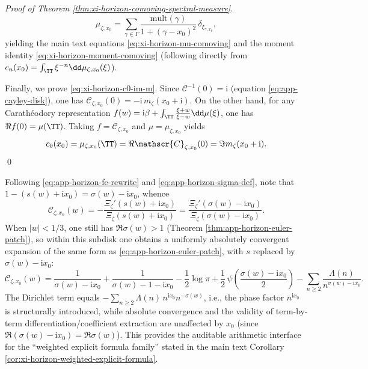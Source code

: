\begin{proof}[Proof of Theorem \ref{thm:xi-horizon-comoving-spectral-measure}]
\[
\mu_{\zeta,x_0}
=
\sum_{\gamma\in\Gamma}\frac{\mathrm{mult}(\gamma)}{1+(\gamma-x_0)^2}\,\delta_{\xi_{\gamma,x_0}},
\]
yielding the main text equations \eqref{eq:xi-horizon-mu-comoving} and the moment identity \eqref{eq:xi-horizon-moment-comoving} (following directly from \(c_n(x_0)=\int_{\TT}\xi^{-n}\dd\mu_{\zeta,x_0}(\xi)\)).
\par
Finally, we prove \eqref{eq:xi-horizon-c0-im-m}.
Since \(\mathcal{C}^{-1}(0)=\mathrm{i}\) (equation \eqref{eq:app-cayley-disk}), one has
\(
\mathscr{C}_{\zeta,x_0}(0)=-\mathrm{i}\,m_{\zeta}(x_0+\mathrm{i})
\).
On the other hand, for any Carath\'eodory representation \(f(w)=\mathrm{i}\beta+\int_{\TT}\frac{\xi+w}{\xi-w}\dd\mu(\xi)\), one has
\(
\Re f(0)=\mu(\TT)
\).
Taking \(f=\mathscr{C}_{\zeta,x_0}\) and \(\mu=\mu_{\zeta,x_0}\) yields
\[
c_0(x_0)=\mu_{\zeta,x_0}(\TT)=\Re \mathscr{C}_{\zeta,x_0}(0)=\Im m_{\zeta}(x_0+\mathrm{i}).
\]
\qed
\end{proof}

\begin{remark}\label{rem:app-horizon-euler-patch-comoving}
Following \eqref{eq:app-horizon-fe-rewrite} and \eqref{eq:app-horizon-sigma-def}, note that
\(
1-(s(w)+\mathrm{i}x_0)=\sigma(w)-\mathrm{i}x_0
\),
whence
\[
\mathscr{C}_{\zeta,x_0}(w)
=-\frac{\Xi_{\zeta}'(s(w)+\mathrm{i}x_0)}{\Xi_{\zeta}(s(w)+\mathrm{i}x_0)}
=\frac{\Xi_{\zeta}'(\sigma(w)-\mathrm{i}x_0)}{\Xi_{\zeta}(\sigma(w)-\mathrm{i}x_0)}.
\]
When \(|w|<1/3\), one still has \(\Re\sigma(w)>1\) (Theorem \ref{thm:app-horizon-euler-patch}), so within this subdisk one obtains a uniformly absolutely convergent expansion of the same form as \eqref{eq:app-horizon-euler-patch}, with \(s\) replaced by \(\sigma(w)-\mathrm{i}x_0\):
\[
\mathscr{C}_{\zeta,x_0}(w)
=\frac{1}{\sigma(w)-\mathrm{i}x_0}+\frac{1}{\sigma(w)-1-\mathrm{i}x_0}
-\frac12\log\pi+\frac12\,\psi\!\left(\frac{\sigma(w)-\mathrm{i}x_0}{2}\right)
-\sum_{n\ge2}\frac{\Lambda(n)}{n^{\sigma(w)-\mathrm{i}x_0}}.
\]
The Dirichlet term equals \(-\sum_{n\ge2}\Lambda(n)\,n^{\mathrm{i}x_0}n^{-\sigma(w)}\), i.e., the phase factor \(n^{\mathrm{i}x_0}\) is structurally introduced, while absolute convergence and the validity of term-by-term differentiation/coefficient extraction are unaffected by \(x_0\) (since \(\Re(\sigma(w)-\mathrm{i}x_0)=\Re\sigma(w)\)).
This provides the auditable arithmetic interface for the ``weighted explicit formula family'' stated in the main text Corollary \ref{cor:xi-horizon-weighted-explicit-formula}.
\end{remark}

